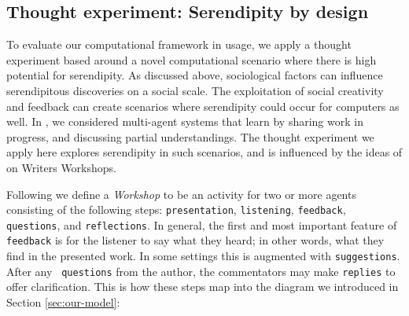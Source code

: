\subsection{Thought experiment:  Serendipity by design} \label{sec:ww}

To evaluate our computational framework in usage, we apply a thought
experiment based around a novel computational scenario where there is
high potential for serendipity.  As discussed above, sociological
factors can influence serendipitous discoveries on a social scale.
The exploitation of social creativity and feedback can create
scenarios where serendipity could occur for computers as well.
%
In \cite{poetry-workshop}, we considered multi-agent systems that
learn by sharing work in progress, and discussing partial
understandings.  The thought experiment we apply here explores
serendipity in such scenarios, and is influenced by the ideas of
 on Writers Workshops.

Following 
we define a \emph{Workshop} to be an activity for two or more agents
consisting of the following steps:
{\tt presentation}, {\tt listening}, {\tt feedback}, {\tt questions},
and {\tt reflections}.  In general, the first and most important
feature of {\tt feedback} is for the listener to say what they heard;
in other words, what they find in the presented work.  In some
settings this is augmented with {\tt suggestions}.  After any {\tt
  questions} from the author, the commentators may make {\tt replies}
to offer clarification.
This is how these steps map into the diagram we introduced in Section \ref{sec:our-model}:


